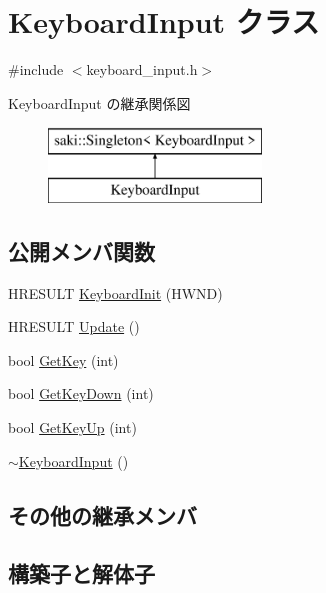\hypertarget{class_keyboard_input}{}\section{Keyboard\+Input クラス}
\label{class_keyboard_input}


{\ttfamily \#include $<$keyboard\+\_\+input.\+h$>$}

Keyboard\+Input の継承関係図\begin{figure}[H]
\begin{center}
\leavevmode
\includegraphics[height=2.000000cm]{class_keyboard_input}
\end{center}
\end{figure}
\subsection*{公開メンバ関数}
\begin{DoxyCompactItemize}
\item 
H\+R\+E\+S\+U\+LT \mbox{\hyperlink{class_keyboard_input_a89e4682682d489e35a73b641a497500c}{Keyboard\+Init}} (H\+W\+ND)
\item 
H\+R\+E\+S\+U\+LT \mbox{\hyperlink{class_keyboard_input_aa185427bfe9156eb21b12aebced6ba81}{Update}} ()
\item 
bool \mbox{\hyperlink{class_keyboard_input_a14966ce798855de8fc79432cabe7fa7b}{Get\+Key}} (int)
\item 
bool \mbox{\hyperlink{class_keyboard_input_aa3e1123287f6e473f6fda0a7af02b148}{Get\+Key\+Down}} (int)
\item 
bool \mbox{\hyperlink{class_keyboard_input_a7d1fc769524aa689c77e347091447b53}{Get\+Key\+Up}} (int)
\item 
\mbox{\hyperlink{class_keyboard_input_a2aa6da03ad4f06f93a2a940ee59d05f9}{$\sim$\+Keyboard\+Input}} ()
\end{DoxyCompactItemize}
\subsection*{その他の継承メンバ}


\subsection{構築子と解体子}
\mbox{\label{class_keyboard_input_a2aa6da03ad4f06f93a2a940ee59d05f9}} 

